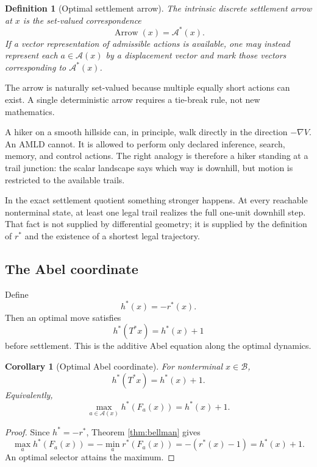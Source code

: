 \documentclass[11pt,letterpaper]{article}
\newtheorem{corollary}[theorem]{Corollary}
\newtheorem{definition}[theorem]{Definition}
\theoremstyle{remark}
\newcommand{\Basin}{\mathcal B}
\newcommand{\A}{\mathcal A}
\newcommand{\rstar}{r^{\!*}}
\begin{document}
\begin{definition}[Optimal settlement arrow]
The intrinsic discrete settlement arrow at $x$ is the set-valued correspondence
\[
\operatorname{Arrow}(x)=\A^*(x).
\]
If a vector representation of admissible actions is available, one may instead represent each $a\in\A(x)$ by a displacement vector and mark those vectors corresponding to $\A^*(x)$.
\end{definition}

The arrow is naturally set-valued because multiple equally short actions can exist. A single deterministic arrow requires a tie-break rule, not new mathematics.

\begin{storybox}
A hiker on a smooth hillside can, in principle, walk directly in the direction $-\nabla V$. An AMLD cannot. It is allowed to perform only declared inference, search, memory, and control actions. The right analogy is therefore a hiker standing at a trail junction: the scalar landscape says which way is downhill, but motion is restricted to the available trails.

In the exact settlement quotient something stronger happens. At every reachable nonterminal state, at least one legal trail realizes the full one-unit downhill step. That fact is not supplied by differential geometry; it is supplied by the definition of $\rstar$ and the existence of a shortest legal trajectory.
\end{storybox}

\subsection{The Abel coordinate}

Define
\[
h^*(x)=-\rstar(x).
\]
Then an optimal move satisfies
\[
h^*(T^*x)=h^*(x)+1
\]
before settlement. This is the additive Abel equation along the optimal dynamics.

\begin{corollary}[Optimal Abel coordinate]\label{cor:abel}
For nonterminal $x\in\Basin$,
\[
\boxed{h^*(T^*x)=h^*(x)+1.}
\]
Equivalently,
\[
\max_{a\in\A(x)}h^*(F_a(x))=h^*(x)+1.
\]
\end{corollary}

\begin{proof}
Since $h^*=-\rstar$, Theorem \ref{thm:bellman} gives
\[
\max_a h^*(F_a(x))=-\min_a\rstar(F_a(x))=-(\rstar(x)-1)=h^*(x)+1.
\]
An optimal selector attains the maximum.
\end{proof}
\end{document}
